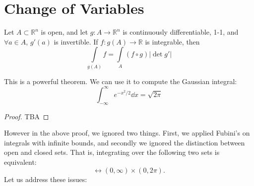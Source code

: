 \documentclass{article}
\numberwithin{equation}{section}
\begin{document}
\newpage
\section{Change of Variables}
\begin{theorem}
    Let $A\subset \mathbb{R}^n$ is open, and let $g: A\rightarrow \mathbb{R}^n$ is continuously differentiable, 1-1, and $\forall a\in A$, $g'(a)$ is invertible. If $f:g(A) \rightarrow \mathbb{R}$ is integrable, then
    \begin{equation}
        \int\limits_{g(A)} f = \int\limits_{A} (f \circ g) |\det g'|
    \end{equation}
\end{theorem}
This is a powerful theorem. We can use it to compute the Gaussian integral:
\begin{equation}
    \int_{-\infty}^{\infty} e^{-x^2/2} \dd{x} = \sqrt{2\pi}
\end{equation}
\begin{proof}
    TBA
\end{proof}
However in the above proof, we ignored two things. First, we applied Fubini's on integrals with infinite bounds, and secondly we ignored the distinction between open and closed sets. That is, integrating over the following two sets is equivalent:
\begin{equation}
    [0,\infty) \times [0,2\pi] \leftrightarrow (0,\infty) \times (0,2\pi).
\end{equation}
Let us address these issues:
\end{document}
